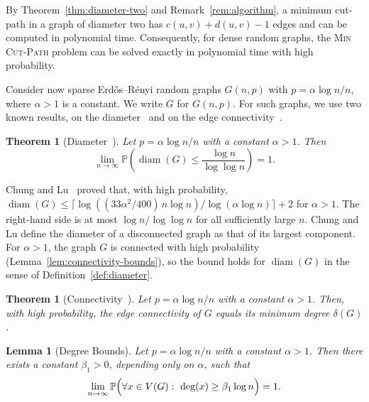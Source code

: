 \documentclass[a4paper,fleqn]{cas-sc}
\numberwithin{equation}{section}
\theoremstyle{definition}
\theoremstyle{plain}
\newtheorem{theorem}[definition]{Theorem}
\newtheorem{lemma}[definition]{Lemma}
\theoremstyle{remark}
\newcommand{\diam}{\operatorname{diam}}
\newcommand{\MinCutPath}{\textsc{Min Cut-Path}}
\begin{document}
By Theorem~\ref{thm:diameter-two} and Remark~\ref{rem:algorithm}, a minimum cut-path in a graph of diameter two has $c(u, v) + d(u, v) - 1$ edges and can be computed in polynomial time.
Consequently, for dense random graphs, the \MinCutPath{} problem can be solved exactly in polynomial time with high probability.

Consider now sparse Erdős–Rényi random graphs $G(n, p)$ with $p = \alpha \log n / n$, where $\alpha > 1$ is a constant.
We write $G$ for $G(n,p)$.
For such graphs, we use two known results, on the diameter~\cite{ChungLu2001} and on the edge connectivity~\cite{Bollobas2001}.

\begin{theorem}[Diameter~\cite{ChungLu2001}]
\label{thm:random-diameter}
Let $p = \alpha \log n / n$ with a constant $\alpha > 1$.
Then
\[
\lim_{n\to\infty} \mathbb{P}\left( \diam(G) \leq \frac{\log n}{\log \log n} \right) = 1.
\]
\end{theorem}

Chung and Lu~\cite{ChungLu2001} proved that, with high probability, $\diam(G) \leq \lceil \log((33\alpha^2/400)\, n \log n) / \log(\alpha \log n) \rceil + 2$ for $\alpha > 1$.
The right-hand side is at most $\log n / \log \log n$ for all sufficiently large $n$.
Chung and Lu define the diameter of a disconnected graph as that of its largest component.
For $\alpha > 1$, the graph $G$ is connected with high probability (Lemma~\ref{lem:connectivity-bounds}), so the bound holds for $\diam(G)$ in the sense of Definition~\ref{def:diameter}.

\begin{theorem}[{Connectivity~\cite[p.~169]{Bollobas2001}}]
\label{thm:random-connectivity}
Let $p = \alpha \log n / n$ with a constant $\alpha > 1$.
Then, with high probability, the edge connectivity of $G$ equals its minimum degree $\delta(G)$.
\end{theorem}

\begin{lemma}[Degree Bounds]
\label{lem:degree-bounds}
Let $p = \alpha \log n / n$ with a constant $\alpha > 1$.
Then there exists a constant $\beta_1 > 0$, depending only on $\alpha$, such that
\[
\lim_{n\to\infty} \mathbb{P}\Bigl( \forall x \in V(G): \ \deg(x) \geq \beta_1 \log n \Bigr) = 1.
\]
\end{lemma}
\end{document}
